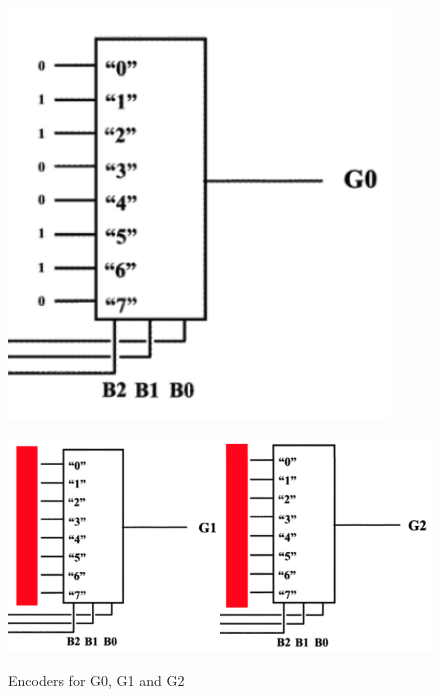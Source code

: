 \documentclass[12pt]{article}
\newcommand{\objects}[2]{%
  \leavevmode\vbox{\hbox{#1}\nointerlineskip\hbox{#2}}%
}
\begin{document}
\begin{figure}[h]
    \begin{minipage}{.55\textwidth}
        \centering
        \includegraphics[width=0.9\textwidth]{Encoder for G0.png}
    \end{minipage}
    \begin{minipage}{.5\textwidth}
        \centering
        \objects
            {\includegraphics[width=0.5\textwidth]{Encoder for G1.png}}
            {\includegraphics[width=0.5\textwidth]{Encoder for G2.png}}
    \end{minipage}
    \caption{Encoders for G0, G1 and G2}
\end{figure}
\end{document}
